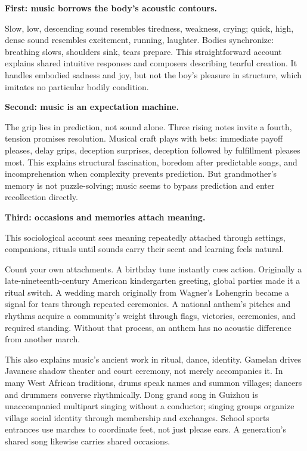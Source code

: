\textbf{First: music borrows the body's acoustic contours.}

Slow, low, descending sound resembles tiredness, weakness, crying; quick, high, dense sound resembles excitement, running, laughter. Bodies synchronize: breathing slows, shoulders sink, tears prepare. This straightforward account explains shared intuitive responses and composers describing tearful creation. It handles embodied sadness and joy, but not the boy's pleasure in structure, which imitates no particular bodily condition.

\textbf{Second: music is an expectation machine.}

The grip lies in prediction, not sound alone. Three rising notes invite a fourth, tension promises resolution. Musical craft plays with bets: immediate payoff pleases, delay grips, deception surprises, deception followed by fulfillment pleases most. This explains structural fascination, boredom after predictable songs, and incomprehension when complexity prevents prediction. But grandmother's memory is not puzzle-solving; music seems to bypass prediction and enter recollection directly.

\textbf{Third: occasions and memories attach meaning.}

This sociological account sees meaning repeatedly attached through settings, companions, rituals until sounds carry their scent and learning feels natural.

Count your own attachments. A birthday tune instantly cues action. Originally a late-nineteenth-century American kindergarten greeting, global parties made it a ritual switch. A wedding march originally from Wagner's Lohengrin became a signal for tears through repeated ceremonies. A national anthem's pitches and rhythms acquire a community's weight through flags, victories, ceremonies, and required standing. Without that process, an anthem has no acoustic difference from another march.

This also explains music's ancient work in ritual, dance, identity. Gamelan drives Javanese shadow theater and court ceremony, not merely accompanies it. In many West African traditions, drums speak names and summon villages; dancers and drummers converse rhythmically. Dong grand song in Guizhou is unaccompanied multipart singing without a conductor; singing groups organize village social identity through membership and exchanges. School sports entrances use marches to coordinate feet, not just please ears. A generation's shared song likewise carries shared occasions.

